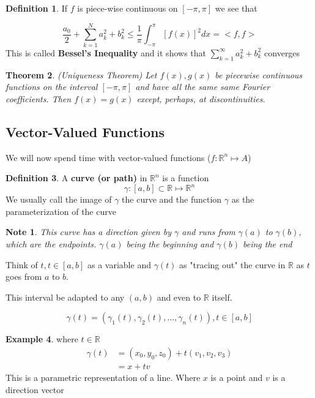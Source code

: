 \documentclass[12pt]{article}
\theoremstyle{plain}
\newtheorem*{note}{Note}
\newtheorem{theorem}{Theorem}[section]
\theoremstyle{definition}
\newtheorem{definition}[theorem]{Definition}
\newtheorem{example}[theorem]{Example}
\begin{document}
\begin{definition}
	If $f$ is piece-wise continuous on $[-\pi, \pi]$ we see that
	
	$$\frac{a_0}{2}+ \sum^N_{k=1} a_k^2 + b_k^2 \leq \frac{1}{\pi} \int_{-\pi}^\pi [f(x)]^2 dx = <f,f>$$
	This is called \textbf{Bessel's Inequality} and it shows that $\sum^\infty_{k=1} a_k^2 + b_k^2$ converges
\end{definition}

\begin{theorem}
(Uniqueness Theorem) Let $f(x), g(x)$ be piecewise continuous functions on the interval $[-\pi,\pi]$ and have all the same same Fourier coefficients. Then $f(x)=g(x)$ except, perhaps, at discontinuities.
\end{theorem}

\subsection{Vector-Valued Functions}

We will now spend time with vector-valued functions ($f:\mathbb{R}^n \mapsto A$)

\begin{definition}
	A \textbf{curve (or path)} in $\mathbb{R}^n$ is a function
	$$\gamma : [a,b] \subset \mathbb{R} \mapsto \mathbb{R}^n$$
	We usually call the image of $\gamma$ the curve and the function $\gamma$ as the parameterization of the curve
\end{definition}

\begin{note}
	This curve has a direction given by $\gamma$ and runs from $\gamma (a)$ to $\gamma (b)$, which are the endpoints. $\gamma (a)$ being the beginning and $\gamma (b)$ being the end
\end{note}

Think of $t, t\in [a,b]$ as a variable and $\gamma (t)$ as "tracing out" the curve in $\mathbb{R}$ as $t$ goes from $a$ to $b$.

This interval be adapted to any $(a,b)$ and even to $\mathbb{R}$ itself.

$$\gamma (t) = (\gamma_1 (t), \gamma_2 (t), ..., \gamma_n (t)), t\in[a,b]$$

\begin{example}
	where $t \in \mathbb{R}$
	\begin{align*}
		\gamma (t) &= (x_0, y_0, z_0) + t(v_1,v_2,v_3)\\
		&= x + tv
	\end{align*}
	This is a parametric representation of a line. Where $x$ is a point and $v$ is a direction vector

\end{example}
\end{document}
